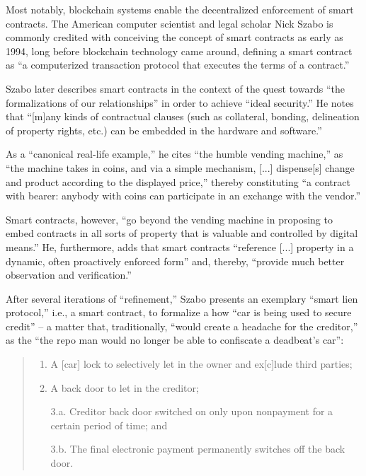Most notably, blockchain systems enable the decentralized enforcement of smart contracts.
The American computer scientist and legal scholar Nick Szabo is commonly credited with conceiving the concept of smart contracts as early as 1994, long before blockchain technology came around, defining a smart contract as ``a computerized transaction protocol that executes the terms of a contract.'' \autocite{szabo1994}

Szabo later describes smart contracts in the context of the quest towards ``the formalizations of our relationships'' in order to achieve ``ideal security.'' \autocite{szabo1997}
He notes that ``[m]any kinds of contractual clauses (such as collateral, bonding, delineation of property rights, etc.) can be embedded in the hardware and software.'' \autocite{szabo1997}

As a ``canonical real-life example,'' he cites ``the humble vending machine,'' as ``the machine takes in coins, and via a simple mechanism, [...] dispense[s] change and product according to the displayed price,'' thereby constituting ``a contract with bearer: anybody with coins can participate in an exchange with the vendor.'' \autocite{szabo1997}

Smart contracts, however, ``go beyond the vending machine in proposing to embed contracts in all sorts of property that is valuable and controlled by digital means.'' \autocite{szabo1997}
He, furthermore, adds that smart contracts ``reference [...] property in a dynamic, often proactively enforced form'' and, thereby, ``provide much better observation and verification.'' \autocite{szabo1997}

After several iterations of ``refinement,'' Szabo presents an exemplary ``smart lien protocol,'' i.e., a smart contract, to formalize a how ``car is being used to secure credit'' -- a matter that, traditionally, ``would create a headache for the creditor,'' as the ``the repo man would no longer be able to confiscate a deadbeat's car'': \autocite{szabo1997}

\begin{quote}
  \begin{enumerate}
    \item A [car] lock to selectively let in the owner and ex[c]lude third parties;
    \item A back door to let in the creditor;
    \item[3.a.] Creditor back door switched on only upon nonpayment for a certain period of time; and
    \item[3.b.] The final electronic payment permanently switches off the back door.
  \end{enumerate}
\end{quote}


